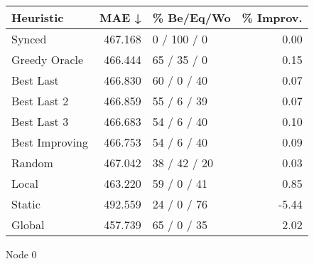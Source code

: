 \begin{tabular}{lrlr}
\toprule
\textbf{Heuristic} & \textbf{MAE ↓} & \textbf{\% Be/Eq/Wo} & \textbf{\% Improv.} \\
\midrule
            Synced &        467.168 &          0 / 100 / 0 &                0.00 \\
     Greedy Oracle &        466.444 &          65 / 35 / 0 &                0.15 \\
         Best Last &        466.830 &          60 / 0 / 40 &                0.07 \\
       Best Last 2 &        466.859 &          55 / 6 / 39 &                0.07 \\
       Best Last 3 &        466.683 &          54 / 6 / 40 &                0.10 \\
    Best Improving &        466.753 &          54 / 6 / 40 &                0.09 \\
            Random &        467.042 &         38 / 42 / 20 &                0.03 \\
             Local &        463.220 &          59 / 0 / 41 &                0.85 \\
            Static &        492.559 &          24 / 0 / 76 &               -5.44 \\
            Global &        457.739 &          65 / 0 / 35 &                2.02 \\
\bottomrule
\end{tabular}
\caption{Node 0}
\label{tab:non_lr01_le1_bs4_0}
